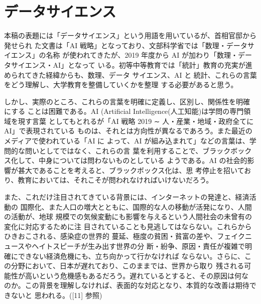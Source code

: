 \documentclass[
]{book}
\theoremstyle{definition}
\theoremstyle{definition}
\theoremstyle{definition}
\theoremstyle{definition}
\theoremstyle{remark}
\begin{document}
\hypertarget{ux30c7ux30fcux30bfux30b5ux30a4ux30a8ux30f3ux30b9}{%
\section{データサイエンス}\label{ux30c7ux30fcux30bfux30b5ux30a4ux30a8ux30f3ux30b9}}

本稿の表題には「データサイエンス」という用語を用いているが、首相官邸から発せられ た文書は「AI 戦略」となっており、文部科学省では「数理・データサイエンス」の名称 が使われてきたが、2019 年度から AI が加わり「数理・データサイエンス・AI」となって いる。初等中等教育では「統計」教育の充実が進められてきた経緯からも、数理、データ サイエンス、AI と 統計、これらの言葉をどう理解し、大学教育を整備していくかを整理 する必要があると思う。

しかし、実際のところ、これらの言葉を明確に定義し、区別し、関係性を明確にする ことは困難である。AI (Artificial Intelligence(人工知能)は学問の専門領域を現す言葉 としてもとれるが「AI 戦略 2019 ∼ 人・産業・地域・政府全てに AI」で表現されている ものは、それとは方向性が異なるであろう。また最近のメディアで使われている「AI に よって、AI が組み込まれて」などの言葉は、学問的な問いとしてではなく、これらの言 葉を利用することで、ブラックボックス化して、中身については問わないものとしている ようである。AI の社会的影響が甚大であることを考えると、ブラックボックス化は、思 考停止を招いており、教育においては、それこそが問われなければいけないだろう。

また、これだけ注目されてきている背景には、インターネットの発達と、経済活動の 国際化、また人口の増大とともに、国際的な人の移動が活発になり、人間の活動が、地球 規模での気候変動にも影響を与えるという人間社会の未曾有の変化に対応するために注 目されていることも見逃してはならない。これらからひきおこされる、感染症の世界的 蔓延、極度の貧困・貧富の差や、フェイクニュースやヘイトスピーチが生み出す世界の分 断・紛争、原因・責任が複雑で明確にできない経済危機にも、立ち向かって行かなければ ならない。さらに、この分野において、日本が遅れており、このままでは、世界から取り 残される可能性が高いという危機感もあるだろう。遅れているとすると、その原因は何な
のか。この背景を理解しなければ、表面的な対応となり、本質的な改善は期待できないと 思われる。({[}11{]} 参照)
\end{document}
